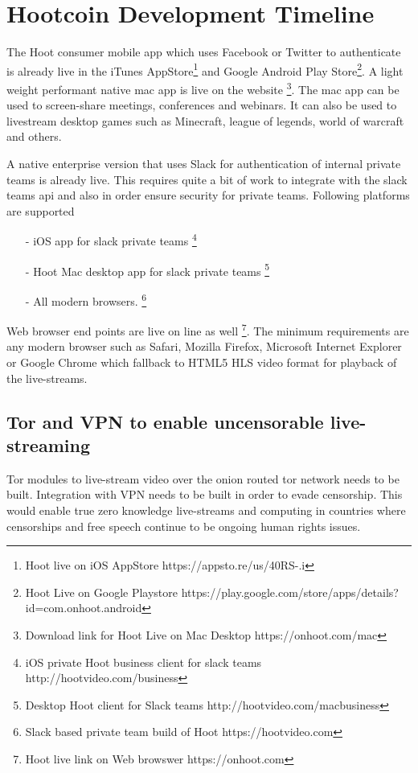 \documentclass{article}
\begin{document}

\section{Hootcoin Development Timeline}
The Hoot consumer mobile app which uses Facebook or Twitter to authenticate is already live in the iTunes AppStore\footnote{Hoot live on iOS AppStore https://appsto.re/us/40RS-.i} and Google Android Play Store\footnote{Hoot Live on Google Playstore https://play.google.com/store/apps/details?id=com.onhoot.android}.
A light weight performant native  mac app is live on
the website \footnote{Download link for Hoot Live on Mac Desktop https://onhoot.com/mac}. The mac app can be used to screen-share meetings, conferences and webinars. It can also be used
to livestream desktop games such as Minecraft, league of legends,
world of warcraft and others.

A native enterprise version that uses Slack for authentication of
internal private teams is already live.
 This requires quite a bit of work to integrate with the slack teams api and also in order  ensure security for private teams. Following platforms are supported
\begin{itemize}

\item[-]iOS app for slack private teams \footnote{ iOS private Hoot business client for slack teams http://hootvideo.com/business}
\item[-]Hoot Mac desktop app for slack private teams \footnote{Desktop Hoot client for Slack teams http://hootvideo.com/macbusiness}
\item[-]All modern browsers. \footnote{Slack based private team build of Hoot https://hootvideo.com}
\end{itemize}

Web browser end points are live on line as well
\footnote{Hoot live link on Web browswer https://onhoot.com}. The minimum requirements are any modern
browser such as Safari, Mozilla Firefox, Microsoft Internet Explorer
or Google Chrome which fallback to HTML5 HLS video format for playback
of the live-streams.


\subsection{Tor and VPN to enable uncensorable live-streaming }
Tor modules to live-stream video over the onion routed tor network needs
to be built. Integration with VPN needs to be built in order to evade censorship. This would enable true zero knowledge live-streams and computing in
countries where censorships and free speech continue to be ongoing
human rights issues.
\end{document}
